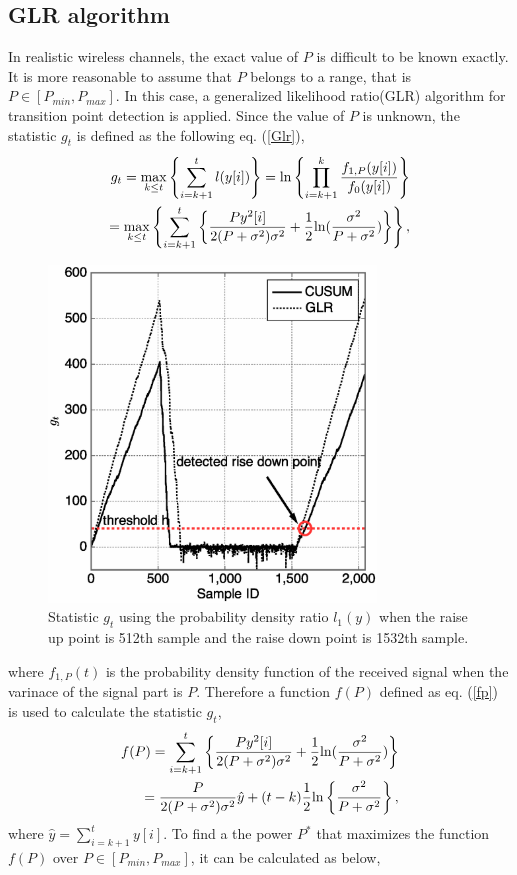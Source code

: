 \subsection{GLR algorithm}
In realistic wireless channels, the exact value of $P$ is difficult to be known exactly. It is more reasonable to assume that $P$ belongs to a range, that is $P \in [P_{min}, P_{max}]$. In this case, a generalized likelihood ratio(GLR) algorithm\cite{ref:GLR} for transition point detection is applied. Since the value of $P$ is unknown, the statistic $g_t$ is defined as the following eq. (\ref{Glr}),
\begin{eqnarray}
g_t = \max_{k \leq t}\left\{ \sum_{i=k+1}^tl(y[i])\right\}={\rm ln}\left\{\prod_{i=k+1}^k\frac{f_{1,P}(y[i])}{f_0(y[i])}\right\} \nonumber \\ 
   = \max_{k \leq t}\left\{\sum_{i=k+1}^t\left\{ \frac{Py^2[i]}{2(P+\sigma^2)\sigma^2}+\frac{1}{2} {\rm ln}(\frac{\sigma^2}{P+\sigma^2}) \right\}\right\},
\label{Glr}
\end{eqnarray}
\begin{figure}[t]
\centering
\includegraphics[width=87mm]{ON2OFF.eps}
\caption{Statistic $g_t$ using the probability density ratio $l_1(y)$ when the raise up point is 512th sample and the raise down point is 1532th sample.}
\label{ON2OFF}
\end{figure}
where $f_{1,P}(t)$ is the probability density function of the received signal when the varinace of the signal part is $P$. Therefore a function $f(P)$ defined as eq. (\ref{fp}) is used to calculate the statistic $g_t$,
\begin{eqnarray}
f(P) = \sum_{i=k+1}^t\left\{ \frac{Py^2[i]}{2(P+\sigma^2)\sigma^2}+\frac{1}{2} {\rm ln}(\frac{\sigma^2}{P+\sigma^2})\right\} \nonumber\\ 
=\frac{P}{2(P+\sigma^2)\sigma^2}\hat{y}+(t-k)\frac{1}{2}{\rm ln}\left\{ \frac{\sigma^2}{P+\sigma^2} \right\},
\label{fp}
\end{eqnarray}
where $\hat{y}=\sum_{i=k+1}^t y[i]$. To find a the power $P^{*}$ that maximizes the function $f(P)$ over $P \in [P_{min}, P_{max}]$, it can be calculated as below,

